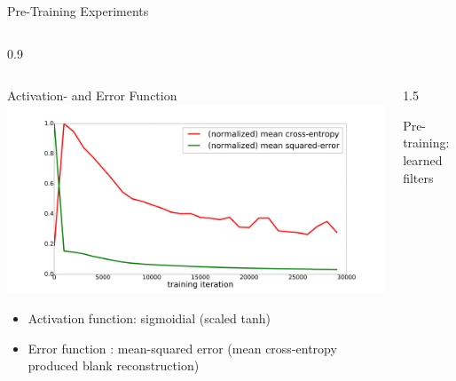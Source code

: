 \documentclass[final]{beamer}
\newlength{\onecolwid}
\newlength{\threecolwid}
\begin{document}
\begin{frame}[t]
\begin{columns}[t]
\begin{column}{\threecolwid}
\begin{alertblock}{Pre-Training Experiments}
\begin{columns}[t, totalwidth=0.9\threecolwid]
\begin{column}{0.9\onecolwid}

\end{column}
\end{columns}

\end{alertblock}


\end{column}
\end{columns} %


\begin{columns}[t]

	\begin{column}{\onecolwid}

		\begin{alertblock}{Activation- and Error Function}
			\centering
			\includegraphics[width=.7\linewidth]{graphics/mse_ce_comparison.png}

			\begin{itemize}
				\item Activation function: sigmoidial (scaled tanh)
				\item Error function     : mean-squared error (mean cross-entropy produced blank reconstruction)
			\end{itemize}

		\end{alertblock}

	\end{column}


	\begin{column}{1.5\onecolwid}

		\begin{alertblock}{Pre-training: learned filters}


\end{alertblock}
\end{column}
\end{columns}
\end{frame}
\end{document}
